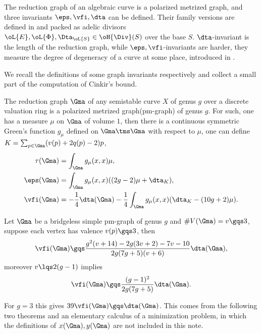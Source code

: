 \documentclass[a4paper, twoside]{article}
\begin{document}

The reduction graph of an algebraic curve is a polarized metrized graph, and three invariants $\eps, \vfi, \dta$ can be defined. Their family versions are defined in \cite{Yuan2021Bigness} and packed as adelic divisors $\oL{E},\oL{\Phi},\Dta_{\oL{S}}\in\oH{\Div}(S)$ over the base $S$. $\dta$-invariant is the length of the reduction graph, while $\eps,\vfi$-invariants are harder, they measure the degree of degeneracy of a curve at some place, introduced in \cite{Zhang1993,Zhang2010GrossSchoen}.


We recall the definitions of some graph invariants respectively and collect a small part of the computation of Cinkir's bound\cite{Cinkir2011}.

\begin{dfn}
	The reduction graph $\Gma$ of any semistable curve $X$ of genus $g$ over a discrete valuation ring is a polarized metrized graph(pm-graph) of genus $g$. For such, one has a measure $\mu$ on $\Gma$ of volume $1$, then there is a continuous symmetric Green's function $g_{\mu}$ defined on $\Gma\tms\Gma$ with respect to $\mu$, one can define $K=\sum_{p\in\Gma}(v(p)+2q(p)-2)p$,
	\begin{align*}
	  \tau(\Gma)&=\int_{\Gma}g_{\mu}(x,x)\mu,\\
	  \eps(\Gma)&=\int_{\Gma}g_{\mu}(x,x)((2g-2)\mu+\dta_{K}),\\
	  \vfi(\Gma)&=-\frac{1}{4}\dta(\Gma)-\frac{1}{4}\int_{\Gma}g_{\mu}(x,x)(\dta_{K}-(10g+2)\mu).\\
	\end{align*}
\end{dfn}


\begin{thm}
	Let $\Gma$ be a bridgeless simple pm-graph of genus $g$ and $\#V(\Gma)=v\gqs3$, suppose each vertex has valence $v(p)\gqs3$, then
	\[
		\vfi(\Gma)\gqs\frac{g^{2}(v+14)-2g(3v+2)-7v-10}{2g(7g+5)(v+6)}\dta(\Gma),
	\]
	moreover $v\lqs2(g-1)$ implies
	\[
		\vfi(\Gma)\gqs\frac{(g-1)^{2}}{2g(7g+5)}\dta(\Gma).
	\]
\end{thm}

\begin{rmk}
	For $g=3$ this gives $39\vfi(\Gma)\gqs\dta(\Gma)$. This comes from the following two theorems and an elementary calculus of a minimization problem, in which the definitions of $x(\Gma),y(\Gma)$ are not included in this note.
\end{rmk}
\end{document}
